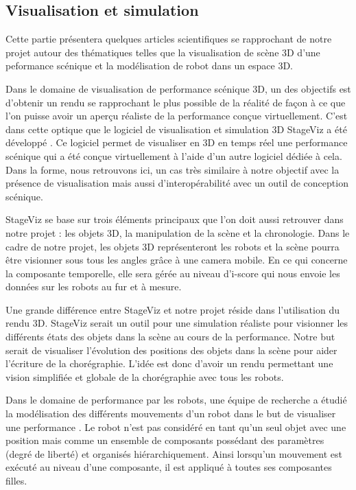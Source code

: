 \subsection{Visualisation et simulation}
Cette partie présentera quelques articles scientifiques se rapprochant de notre projet autour des thématiques telles que la visualisation de scène 3D d'une peformance scénique et la modélisation de robot dans un espace 3D. 

Dans le domaine de visualisation de performance scénique 3D, un des objectifs est d'obtenir un rendu se rapprochant le plus possible de la réalité de façon à ce que l'on puisse avoir un aperçu réaliste de la performance conçue virtuellement. C'est dans cette optique que le logiciel de visualisation et simulation 3D StageViz\cite{StageViz} a été développé . Ce logiciel permet de visualiser en 3D en temps réel une performance scénique qui a été conçue virtuellement à l'aide d'un autre logiciel dédiée à cela. Dans la forme, nous retrouvons ici, un cas très similaire à notre objectif avec la présence de visualisation mais aussi d'interopérabilité avec un outil de conception scénique.

StageViz se base sur trois éléments principaux que l'on doit aussi retrouver dans notre projet : les objets 3D, la manipulation de la scène et la chronologie. Dans le cadre de notre projet, les objets 3D représenteront les robots et la scène pourra être visionner sous tous les angles grâce à une camera mobile. En ce qui concerne la composante temporelle, elle sera gérée au niveau d'i-score qui nous envoie les données sur les robots au fur et à mesure. 

Une grande différence entre StageViz et notre projet réside dans l'utilisation du rendu 3D. StageViz serait un outil pour une simulation réaliste pour visionner les différents états des objets dans la scène au cours de la performance. Notre but serait de visualiser l'évolution des positions des objets dans la scène pour aider l'écriture de la chorégraphie. L'idée est donc d'avoir un rendu permettant une vision simplifiée et globale de la chorégraphie avec tous les robots.

Dans le domaine de performance par les robots, une équipe de recherche a étudié la modélisation des différents mouvements d'un robot dans le but de visualiser une performance \cite{robotArt}. Le robot n'est pas considéré en tant qu'un seul objet avec une position mais comme un ensemble de composants possédant des paramètres (degré de liberté) et organisés hiérarchiquement. Ainsi lorsqu'un mouvement est exécuté au niveau d'une composante, il est appliqué à toutes ses composantes filles.